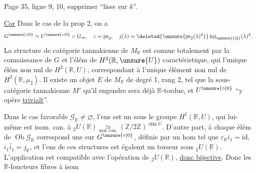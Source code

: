 Page 35, ligne 9, 10, supprimer ``lisse sur $k$''.

\uline{Cor} Dans le cas de la prop 2,  on a
\[
G^{\unsure{\circ|0}}\simeq U^{\unsure{\circ|0}}\times G_m,\quad\varepsilon=\operatorname{pr}_2,\quad j(\lambda)=\deleted{\unsure{\operatorname{pr}_2(\lambda)^2}}\operatorname{inj}_{\unsure{1|2}}(\lambda)^2.
\]
La structure  de catégorie tannakienne de $M_{\mathbb R}$ est connue totalement par la connaissance de $G$ et l'élém de $H^2(\mathbb R,\unsure{U})$ caractéristique, qui   l'unique élém non nul de $H^2(\mathbb R,U)$, correspondant à l'unique élément non nul de $H^2(\mathbb R,\mu_2)$. Il existe un  objet $E$ de $M_{\mathbb R}$  de degré 1, rang 2,  tel que la sous-catégorie tannakienne  $M'$ qu'il engendre sera déjà $\mathbb R$-tordue, et    $U^{\unsure{\circ|0}}$ ``y opère \uline{trivialt}''.

Dans le cas favorable $\mathscr G_{\mathbb R}\ne\varnothing$,  l'ens   est un   sous le groupe $H^1(\mathbb R,U)$, qui lui-même est isom. can. à ${}_2U(\mathbb R)\underset{\text{non can.}}{\simeq}(\mathbb Z/2\mathbb Z)^{\dim U}$. D'autre part, à chaque élém de $\operatorname{Ob}\mathscr G_{\mathbb R}$ correspond une   sur $G^{\unsure{\circ|0}}$, définie par un hom
tel que $\varepsilon_{\mathbb R}i_1=\mathrm{id}$, $i_1\bar i_1=j_{\mathbb R}$, et l'ens de ces structures est égalemt un torseur sous ${}_2U(\mathbb R)$. L'application
est compatible avec l'opération de ${}_2U(\mathbb R)$, \uline{donc bijective}. Donc les $\mathbb R$-foncteurs fibres à isom


